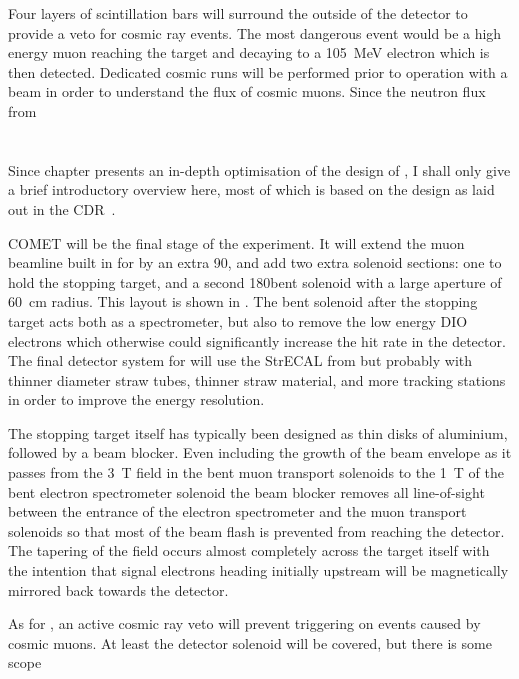 Four layers of scintillation bars will surround the outside of the detector to provide a veto for cosmic ray events.
The most dangerous event would be a high energy muon reaching the target and decaying to a 105~MeV electron which is then detected. 
Dedicated cosmic runs will be performed prior to operation with a beam in order to understand the flux of cosmic muons.
Since the neutron flux from

\section{\COMET \phaseII}
\FigPhaseII
Since chapter  presents an in-depth optimisation of the design of \phaseII, I shall only give a brief introductory overview here, most of which is based on the design as laid out in the CDR~\cite{CDRphase2}.

COMET \phaseII will be the final stage of the experiment.
It will extend the muon beamline built in for \phaseI by an extra 90\degree, and add two extra solenoid sections: one to hold the stopping target, and a second 180\degree bent solenoid with a large aperture of 60~cm radius.
This layout is shown in .
The bent solenoid after the stopping target acts both as a spectrometer, but also to remove the low energy \ac{DIO} electrons which otherwise could significantly increase the hit rate in the detector.
The final detector system for \phaseII will use the \ac{StrECAL} from \phaseI but probably with thinner diameter straw tubes, thinner straw material, and more tracking stations in order to improve the energy resolution.

The stopping target itself has typically been designed as thin disks of aluminium, followed by a beam blocker.  
Even including the growth of the beam envelope as it passes from the 3~T field in the bent muon transport solenoids to the 1~T of the bent electron spectrometer solenoid the beam blocker removes all line-of-sight between the entrance of the electron spectrometer and the muon transport solenoids so that most of the beam flash is prevented from reaching the detector.
The tapering of the field occurs almost completely across the target itself with the intention that signal electrons heading initially upstream will be magnetically mirrored back towards the detector.

As for \phaseI, an active cosmic ray veto will prevent triggering on events caused by cosmic muons.
At least the detector solenoid will be covered, but there is some scope


